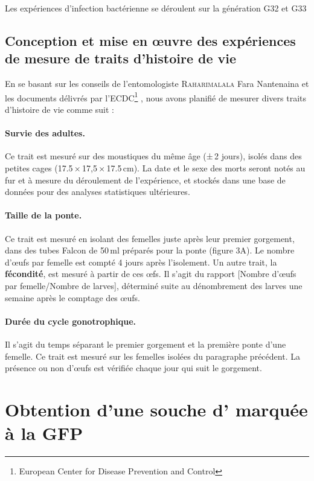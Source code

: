 Les expériences d'infection bactérienne se déroulent sur la génération G32 et G33

\subsection{Conception et mise en \oe{}uvre des expériences de mesure de traits d'histoire de vie}

En se basant sur les conseils de l'entomologiste \textsc{Raharimalala} Fara Nantenaina et les documents délivrés par l'ECDC\footnote{European Center for Disease Prevention and Control} \cite{ecdc}, nous avons planifié de mesurer divers traits d'histoire de vie comme suit :

\paragraph{Survie des adultes.} Ce trait est mesuré sur des moustiques du même âge (±\,2 jours), isolés dans des petites cages (17.5\,×\,17,5\,×\,17.5\,cm). La date et le sexe des morts seront notés au fur et à mesure du déroulement de l'expérience, et stockés dans une base de données pour des analyses statistiques ultérieures.

\paragraph{Taille de la ponte.} Ce trait est mesuré en isolant des femelles juste après leur premier gorgement, dans des tubes Falcon de 50\,ml préparés pour la ponte (figure 3A). Le nombre d'\oe{}ufs par femelle est compté 4 jours après l'isolement.
Un autre trait, la \textbf{fécondité}, est mesuré à partir de ces \oe{}fs. Il s'agit du rapport [Nombre d'\oe{}ufs par femelle/Nombre de larves], déterminé suite au dénombrement des larves une semaine après le comptage des \oe{}ufs.

\paragraph{Durée du cycle gonotrophique.} Il s'agit du temps séparant le premier gorgement et la première ponte d'une femelle. Ce trait est mesuré sur les femelles isolées du paragraphe précédent. La présence ou non d'\oe{}ufs est vérifiée chaque jour qui suit le gorgement.

\section{Obtention d'une souche d' marquée à la GFP}


